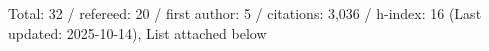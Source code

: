 Total: 32 / refereed: 20 / first author: 5 / citations: 3,036 / h-index: 16 (Last updated: 2025-10-14), List attached below